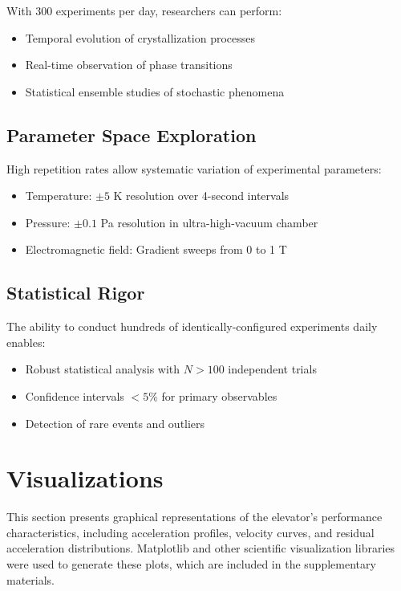 ﻿\documentclass[a4paper,12pt]{article}
\theoremstyle{definition}
\begin{document}
With 300 experiments per day, researchers can perform:
\begin{itemize}
	\item Temporal evolution of crystallization processes
	\item Real-time observation of phase transitions
	\item Statistical ensemble studies of stochastic phenomena
\end{itemize}

\subsection{Parameter Space Exploration}

High repetition rates allow systematic variation of experimental parameters:
\begin{itemize}
	\item Temperature: $\pm 5$ K resolution over 4-second intervals
	\item Pressure: $\pm 0.1$ Pa resolution in ultra-high-vacuum chamber
	\item Electromagnetic field: Gradient sweeps from 0 to 1 T
\end{itemize}

\subsection{Statistical Rigor}

The ability to conduct hundreds of identically-configured experiments daily enables:
\begin{itemize}
	\item Robust statistical analysis with $N > 100$ independent trials
	\item Confidence intervals $< 5\%$ for primary observables
	\item Detection of rare events and outliers
\end{itemize}

\section{Visualizations}

This section presents graphical representations of the elevator's performance characteristics, including acceleration profiles, velocity curves, and residual acceleration distributions.
Matplotlib and other scientific visualization libraries were used to generate these plots, which are included in the supplementary materials.
\end{document}
